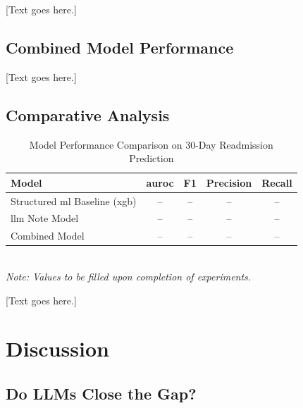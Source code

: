 \documentclass[12pt, a4paper]{article}
\begin{document}
[Text goes here.]

\subsection{Combined Model Performance}

[Text goes here.]

\subsection{Comparative Analysis}

\begin{table}[H]
  \caption{Model Performance Comparison on 30-Day Readmission Prediction}
  \label{tab:results_comparison}
  \centering
  \singlespacing\small
  \begin{tabularx}{\textwidth}{X c c c c}
    \toprule
    \textbf{Model} & \textbf{\gls{auroc}} & \textbf{F1} & \textbf{Precision} & \textbf{Recall} \\
    \midrule
    Structured \gls{ml} Baseline (\gls{xgb}) & -- & -- & -- & -- \\
    \gls{llm} Note Model                      & -- & -- & -- & -- \\
    Combined Model                            & -- & -- & -- & -- \\
    \bottomrule
  \end{tabularx}
  \\[0.5em]
  \footnotesize\textit{Note: Values to be filled upon completion of experiments.}
\end{table}

[Text goes here.]

\section{Discussion}

\subsection{Do LLMs Close the Gap?}
\end{document}
